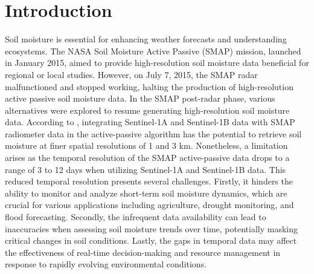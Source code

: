 \documentclass[11pt]{article}
\begin{document}
\section{Introduction}
Soil moisture is essential for enhancing weather forecasts and understanding ecosystems. The NASA Soil Moisture Active Passive (SMAP) mission, launched in January 2015, aimed to provide high-resolution soil moisture data beneficial for regional or local studies. However, on July 7, 2015, the SMAP radar malfunctioned and stopped working, halting the production of high-resolution active passive soil moisture data. In the SMAP post-radar phase, various alternatives were explored to resume generating high-resolution soil moisture data. According to \citet{das2019smap}, integrating Sentinel-1A and Sentinel-1B data with SMAP radiometer data in the active-passive algorithm has the potential to retrieve soil moisture at finer spatial resolutions of 1 and 3 km. Nonetheless, a limitation arises as the temporal resolution of the SMAP active-passive data drops to a range of 3 to 12 days when utilizing Sentinel-1A and Sentinel-1B data. This reduced temporal resolution presents several challenges. Firstly, it hinders the ability to monitor and analyze short-term soil moisture dynamics, which are crucial for various applications including agriculture, drought monitoring, and flood forecasting. Secondly, the infrequent data availability can lead to inaccuracies when assessing soil moisture trends over time, potentially masking critical changes in soil conditions. Lastly, the gaps in temporal data may affect the effectiveness of real-time decision-making and resource management in response to rapidly evolving environmental conditions. 
\end{document}
